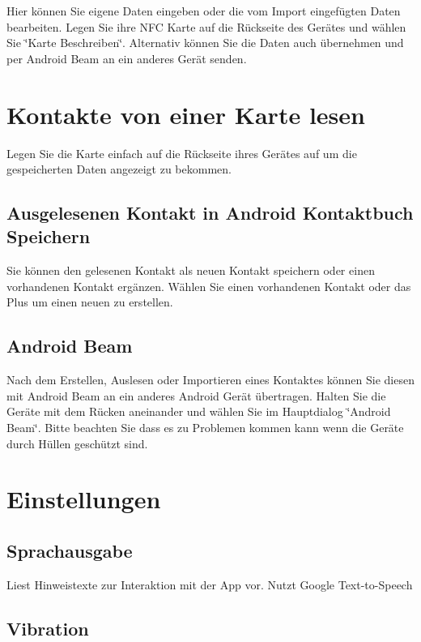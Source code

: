 \documentclass[a4paper,ngerman,12pt]{scrreprt}
\newcommand{\+}{\discretionary{\mbox{\scriptsize$\hookleftarrow$}}{}{}}
\begin{document}
Hier können Sie eigene Daten eingeben oder die vom Import eingefügten Daten bearbeiten. Legen Sie ihre N\+FC Karte auf die Rückseite des Gerätes und wählen Sie \char`\"{}\+Karte Beschreiben\char`\"{}. Alternativ können Sie die Daten auch übernehmen und per Android Beam an ein anderes Gerät senden.

\section{Kontakte von einer Karte lesen}

Legen Sie die Karte einfach auf die Rückseite ihres Gerätes auf um die gespeicherten Daten angezeigt zu bekommen. 

\subsection{Ausgelesenen Kontakt in Android Kontaktbuch Speichern}

Sie können den gelesenen Kontakt als neuen Kontakt speichern oder einen vorhandenen Kontakt ergänzen. Wählen Sie einen vorhandenen Kontakt oder das Plus um einen neuen zu erstellen.

\subsection{Android Beam}

Nach dem Erstellen, Auslesen oder Importieren eines Kontaktes können Sie diesen mit Android Beam an ein anderes Android Gerät übertragen. Halten Sie die Geräte mit dem Rücken aneinander und wählen Sie im Hauptdialog \char`\"{}\+Android Beam\char`\"{}. Bitte beachten Sie dass es zu Problemen kommen kann wenn die Geräte durch Hüllen geschützt sind.

\section{Einstellungen}

\subsection{Sprachausgabe}

Liest Hinweistexte zur Interaktion mit der App vor. Nutzt Google Text-\/to-\/\+Speech \subsection{Vibration}
\end{document}
